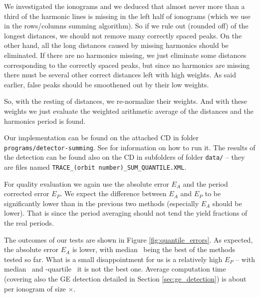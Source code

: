 We investigated the ionograms and we deduced that almost never more than a third of the harmonic lines is missing in the left half of ionograms (which we use in the rows/columns summing algorithm). So if we rule out (rounded off)  of the longest distances, we should not remove many correctly spaced peaks. On the other hand, all the long distances caused by missing harmonics should be eliminated. If there are no harmonics missing, we just eliminate some distances corresponding to the correctly spaced peaks, but since no harmonics are missing there must be several other correct distances left with high weights. As said earlier, false peaks should be smoothened out by their low weights.

So, with the resting  of distances, we re-normalize their weights. And with these weights we just evaluate the weighted arithmetic average of the distances and the harmonics period is found. 

Our implementation can be found on the attached CD in folder \texttt{programs/detector-summing}. See  for information on how to run it. The results of the detection can be found also on the CD in subfolders of folder \texttt{data/} -- they are files named \texttt{TRACE\_(orbit number)\_SUM\_QUANTILE.XML}.

For quality evaluation we again use the absolute error $E_A$ and the period corrected error $E_P$. We expect the difference between $E_A$ and $E_P$ to be significantly lower than in the previous two methods (especially $E_A$ should be lower). That is since the period averaging should not tend the yield fractions of the real periods.   

The outcomes of our tests are shown in Figure \ref{fig:quantile_errors}. As expected, the absolute error $E_A$ is lower, with median~ being the best of the methods tested so far. What is a small disappointment for us is a relatively high $E_P$ -- with median~ and \mbox{}-quartile~ it is not the best one. Average computation time (covering also the GE detection detailed in Section \ref{sec:ge_detection}) is about  per ionogram of size $\times$.

